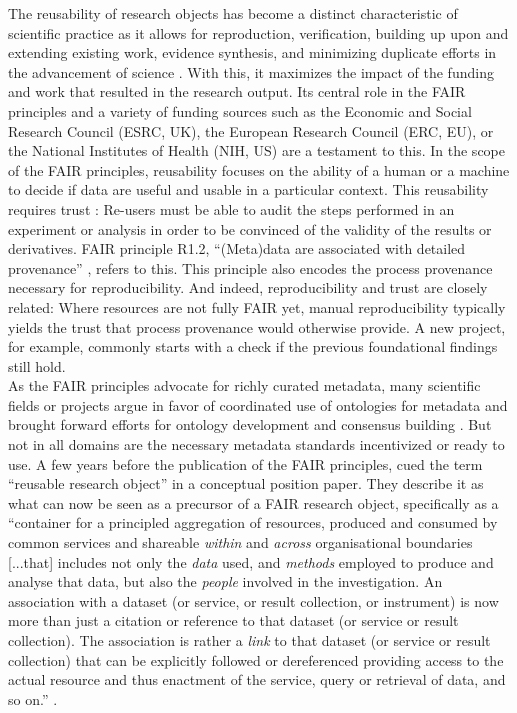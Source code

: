 The reusability of research objects has become a distinct characteristic of scientific practice as it allows for reproduction, verification, building up upon and extending existing work, evidence synthesis, and minimizing duplicate efforts in the advancement of science \citep{thanos2017research}.
With this, it maximizes the impact of the funding and work that resulted in the research output.
Its central role in the \gls{FAIR} principles \citep{wilkinson2016fair} and a variety of funding sources such as the Economic and Social Research Council (ESRC, UK), the European Research Council (ERC, EU), or the National Institutes of Health (NIH, US) are a testament to this.
In the scope of the FAIR principles, reusability focuses on the ability of a human or a machine to decide if data are useful and usable in a particular context.
This reusability requires trust \citep{bechhofer2013linked}: Re-users must be able to audit the steps performed in an experiment or analysis in order to be convinced of the validity of the results or derivatives.
FAIR principle R1.2, ``(Meta)data are associated with detailed provenance'' \citep{wilkinson2016fair}, refers to this.
This principle also encodes the process provenance necessary for reproducibility.
And indeed, reproducibility and trust are closely related:
Where resources are not fully FAIR yet, manual reproducibility typically yields the trust that process provenance would otherwise provide.
A new project, for example, commonly starts with a check if the previous foundational findings still hold.\\
As the FAIR principles advocate for richly curated metadata, many scientific fields or projects argue in favor of coordinated use of ontologies for metadata and brought forward efforts for ontology development and consensus building \citep[e.g.,][]{wise2019implementation, abrams2022standards, papadiamantis2020metadata}.
But not in all domains are the necessary metadata standards incentivized or ready to use.
A few years before the publication of the FAIR principles, \citet{bechhofer2010research} cued the term ``reusable research object'' in a conceptual position paper.
They describe it as what can now be seen as a precursor of a FAIR research object, specifically as a ``container for a principled aggregation of resources, produced and consumed by common services and shareable \textit{within} and \textit{across} organisational boundaries [...that] includes not only the \textit{data} used, and \textit{methods} employed to produce and analyse that data, but also the \textit{people} involved in the investigation. An association with a dataset (or service, or result collection, or instrument) is now more than just a citation or reference to that dataset (or service or result collection). The association is rather a \textit{link} to that dataset (or service or result collection) that can be explicitly followed or dereferenced providing access to the actual resource and thus enactment of the service, query or retrieval of data, and so on.'' \citep{bechhofer2010research}.
